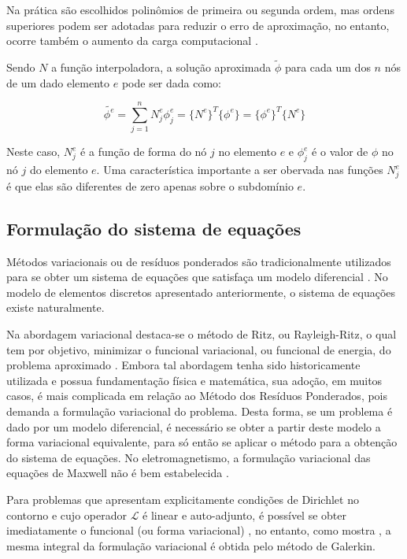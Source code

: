 \documentclass[
    12pt,               %
    openright,          %
    oneside,
    a4paper,            %
    english,            %
    french,             %
    spanish,            %
    brazil              %
    ]{abntex2}
\begin{document}
Na prática são escolhidos polinômios de primeira ou segunda ordem, mas ordens superiores podem ser adotadas para reduzir o erro de aproximação, no entanto, ocorre também o aumento da carga computacional \cite[p. 32]{jin}.

Sendo $N$ a função interpoladora, a solução aproximada $\tilde{\phi}$ para cada um dos $n$ nós de um dado elemento $e$ pode ser dada como:

 \begin{equation}
    \label{eq:interpol}
        \tilde{\phi^e} = \sum_{j=1}^{n}{N_j^e \phi_j^e} = 
        \{N^e\}^T \{\phi^e\} = \{\phi^e\}^T \{N^e\}
 \end{equation}

Neste caso, $N_j^e$ é a função de forma do nó $j$ no elemento $e$ e $\phi_j^e$ é o valor de $\phi$ no nó $j$ do elemento $e$.
Uma característica importante a ser obervada nas funções $N_j^e$ é que elas são diferentes de zero apenas sobre o subdomínio $e$.

\subsection{Formulação do sistema de equações}
Métodos variacionais ou de resíduos ponderados são tradicionalmente utilizados para se obter um sistema de equações que satisfaça um modelo diferencial \cite[p. 34]{jin}. No modelo de elementos discretos apresentado anteriormente, o sistema de equações existe naturalmente.

Na abordagem variacional destaca-se o método de Ritz, ou Rayleigh-Ritz, o qual tem por objetivo, minimizar o funcional variacional, ou funcional de energia, do problema aproximado \cite[p. 24]{volakis}. Embora tal abordagem tenha sido historicamente utilizada e possua fundamentação física e matemática, sua adoção, em muitos casos, é mais complicada em relação ao Método dos Resíduos Ponderados, pois demanda a formulação variacional do problema. Desta forma, se um problema é dado por um modelo diferencial, é necessário se obter a partir deste modelo a forma variacional equivalente, para só então se aplicar o método para a obtenção do sistema de equações. No eletromagnetismo, a formulação variacional das equações de Maxwell não é bem estabelecida \cite[p. 211]{jin}.

Para problemas que apresentam explicitamente condições de Dirichlet no contorno e cujo operador $\mathcal{L}$ é linear e auto-adjunto, é possível se obter imediatamente o funcional (ou forma variacional) \cite[p. 81]{zien}, no entanto, como mostra \cite[p. 29]{volakis}, a mesma integral da formulação variacional é obtida pelo método de Galerkin.
\end{document}
